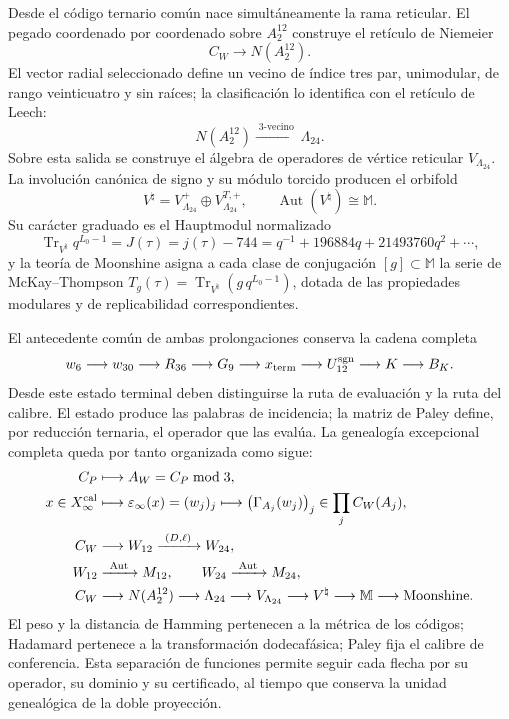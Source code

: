 Desde el código ternario común nace simultáneamente la rama reticular. El
pegado coordenado por coordenado sobre \(A_2^{12}\) construye el retículo de
Niemeier
\[
 C_W\longrightarrow N(A_2^{12}).
\]
El vector radial seleccionado define un vecino de índice tres par,
unimodular, de rango veinticuatro y sin raíces; la clasificación lo identifica
con el retículo de Leech:
\[
 N(A_2^{12})\xrightarrow{\;3\text{-vecino}\;}\Lambda_{24}.
\]
Sobre esta salida se construye el álgebra de operadores de vértice reticular
\(V_{\Lambda_{24}}\). La involución canónica de signo y su módulo torcido
producen el orbifold
\[
 V^\natural=V_{\Lambda_{24}}^+
 \oplus V_{\Lambda_{24}}^{T,+},
 \qquad
 \operatorname{Aut}(V^\natural)\cong\mathbb M.
\]
Su carácter graduado es el Hauptmodul normalizado
\[
 \operatorname{Tr}_{V^\natural}q^{L_0-1}
 =J(\tau)=j(\tau)-744
 =q^{-1}+196884q+21493760q^2+\cdots,
\]
y la teoría de Moonshine asigna a cada clase de conjugación
\([g]\subset\mathbb M\) la serie de McKay--Thompson
\(T_g(\tau)=\operatorname{Tr}_{V^\natural}
(g\,q^{L_0-1})\), dotada de las propiedades modulares y de replicabilidad
correspondientes.

El antecedente común de ambas prolongaciones conserva la cadena completa
\[
 w_6\longrightarrow w_{30}\longrightarrow R_{36}\longrightarrow G_9
 \longrightarrow x_{\rm term}\longrightarrow U_{12}^{\rm sgn}
 \longrightarrow K\longrightarrow B_K.
\]
Desde este estado terminal deben distinguirse la ruta de evaluación y la ruta
del calibre. El estado produce las palabras de incidencia; la matriz de Paley
define, por reducción ternaria, el operador que las evalúa. La genealogía
excepcional completa queda por tanto organizada como sigue:
\[
\begin{aligned}
C_P&\longmapsto A_W=C_P\bmod3,\\
x\in X_\infty^{\rm cal}
&\longmapsto \varepsilon_\infty(x)=(w_j)_j
 \longmapsto\bigl(\Gamma_{A_j}(w_j)\bigr)_j
 \in\prod_j C_W(A_j),\\
C_W
&\longrightarrow W_{12}\xrightarrow{\ (D,\ell)\ }W_{24},\\
W_{12}&\xrightarrow{\ \operatorname{Aut}\ }M_{12},
\qquad W_{24}\xrightarrow{\ \operatorname{Aut}\ }M_{24},\\
C_W
&\longrightarrow N(A_2^{12})\longrightarrow\Lambda_{24}
 \longrightarrow V_{\Lambda_{24}}\longrightarrow V^\natural
 \longrightarrow\mathbb M\longrightarrow\text{Moonshine}.
\end{aligned}
\]
El peso y la distancia de Hamming pertenecen a la métrica de los códigos;
Hadamard pertenece a la transformación dodecafásica; Paley fija el calibre
de conferencia. Esta separación de funciones permite seguir cada flecha por
su operador, su dominio y su certificado, al tiempo que conserva la unidad
genealógica de la doble proyección.
